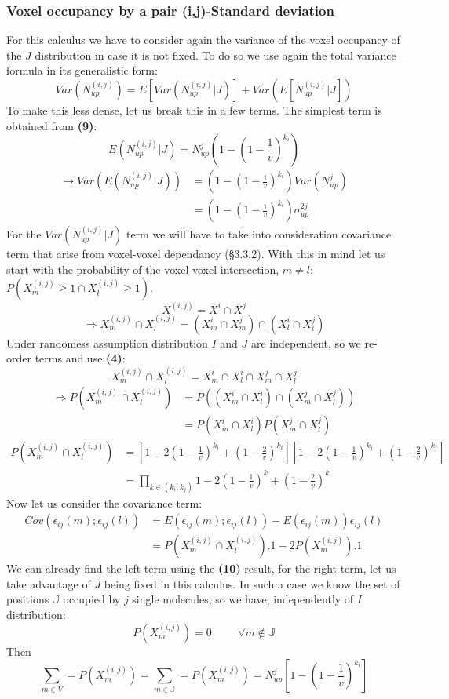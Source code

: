 \documentclass{article}
\begin{document}
\subsubsection{Voxel occupancy by a pair (i,j)-Standard deviation}
For this calculus we have to consider again the variance of the voxel occupancy of the $J$ distribution in case it is not fixed. To do so we use again
the total variance formula in its generalistic form:
\[
    Var(N^{(i,j)}_{up}) = E[Var(N^{(i,j)}_{up}|J)] + Var(E[N^{(i,j)}_{up}|J])
\]
To make this less dense, let us break this in a few terms.\newline
The simplest term is obtained from \textbf{(9)}:
\[
E(N^{(i,j)}_{up}|J) = N^j_{up}(1-(1-\frac{1}{v})^{k_i})
\]
\[\begin{split}
    \rightarrow Var(E(N^{(i,j)}_{up}|J)) &= (1-{(1-\frac{1}{v})}^{k_i})Var(N^j_{up}) \\
    &=(1-(1-\frac{1}{v})^{k_i})\sigma^{2j}_{up}
\end{split}
\]
For the $Var(N^{(i,j)}_{up}|J)$ term we will have to take into consideration covariance term that arise 
from voxel-voxel dependancy (\S3.3.2). With this in mind
let us start with the probability of the voxel-voxel intersection, $m \neq l$: $P(X^{(i,j)}_m \geq 1 \cap X^{(i,j)}_l \geq 1)$.
\[
X^{(i,j)} = X^i \cap X^j
\]
\[
\Rightarrow X_m^{(i,j)} \cap X_l^{(i,j)} = (X_m^i \cap X_m^j) \cap (X_l^i \cap X_l^j)
\]
Under randomess assumption distribution $I$ and $J$ are independent, so we re-order terms and use \textbf{(4)}:
\[
    X_m^{(i,j)} \cap X_l^{(i,j)} = X_m^i \cap X_l^i \cap X_m^j \cap X_l^j
\]
\[\begin{split}
    \Rightarrow P(X_m^{(i,j)} \cap X_l^{(i,j)}) &= P((X_m^i \cap X_l^i) \cap (X_m^j \cap X_l^j)) \\
    &= P(X_m^i \cap X_l^i)P(X_m^j \cap X_l^j)
\end{split}
\]
\begin{equation}
    \begin{split}
    P(X_m^{(i,j)} \cap X_l^{(i,j)}) &=  [1 - 2(1-\frac{1}{v})^{k_i} + (1-\frac{2}{v})^{k_i}][1 - 2{(1-\frac{1}{v})}^{k_j} + (1-\frac{2}{v})^{k_j}] \\ 
                                    &= \prod_{k\in(k_i,k_j)} 1 - 2{(1-\frac{1}{v})}^{k} + {(1-\frac{2}{v})}^{k}
\end{split}
\end{equation}
Now let us consider the covariance term:
\[\begin{split}
    Cov(\epsilon_{ij}(m); \epsilon_{ij}(l)) &= E(\epsilon_{ij}(m);\epsilon_{ij}(l)) - E(\epsilon_{ij}(m))\epsilon_{ij}(l) \\
    &= P(X_m^{(i,j)} \cap X_l^{(i,j)}).1 - 2P(X_m^{(i,j)}).1
\end{split}
\]
We can already find the left term using the \textbf{(10)} result, for the right term, let us take advantage of $J$ being
fixed in this calculus. In such a case we know the set of positions $\mathbb{J}$ occupied by $j$ single molecules, so
we have, independently of $I$ distribution:
\[
    P(X_m^{(i,j)}) = 0 \hspace{1cm} \forall m \notin \mathbb{J}  
\]
Then
\[
    \sum_{m \in V} = P(X_m^{(i,j)}) = \sum_{m \in \mathbb{J}} = P(X_m^{(i,j)}) = N^j_{up}[1-{(1-\frac{1}{v})}^{k_i}]
\]
\end{document}
